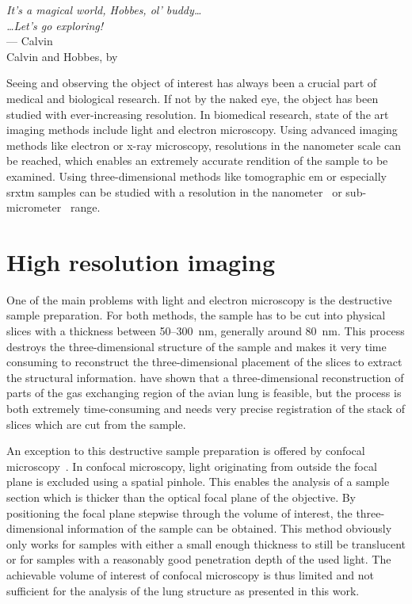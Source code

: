 \acresetall
{}\label{ch:introduction}
\begin{flushright}{\slshape
		It's a magical world, Hobbes, ol' buddy\ldots\\
		\ldots Let's go exploring!}\\ \medskip
		--- Calvin\\Calvin and Hobbes, by \citep{Watterson1996}
\end{flushright}
\vspace{74mm}

Seeing and observing the object of interest has always been a crucial part of medical and biological research. If not by the naked eye, the object has been studied with ever-increasing resolution. In biomedical research, state of the art imaging methods include light and electron microscopy. Using advanced imaging methods like electron or x-ray microscopy, resolutions in the nanometer scale can be reached, which enables an extremely accurate rendition of the sample to be examined. Using three-dimensional methods like tomographic \ac{em} or especially \ac{srxtm} samples can be studied with a resolution in the nanometer~\cite{Downing2007} or sub-micrometer~\cite{Stampanoni2010} range.

\section{High resolution imaging}
One of the main problems with light and electron microscopy is the destructive sample preparation. For both methods, the sample has to be cut into physical slices with a thickness between 50--\SI{300}{\nano\meter}, generally around \SI{80}{\nano\meter}. This process destroys the three-dimensional structure of the sample and makes it very time consuming to reconstruct the three-dimensional placement of the slices to extract the structural information. \citet{Woodward2005} have shown that a three-dimensional reconstruction of parts of the gas exchanging region of the avian lung is feasible, but the process is both extremely time-consuming and needs very precise registration of the stack of slices which are cut from the sample.

An exception to this destructive sample preparation is offered by confocal microscopy~\cite{Minsky1961}. In confocal microscopy, light originating from outside the focal plane is excluded using a spatial pinhole. This enables the analysis of a sample section which is thicker than the optical focal plane of the objective. By positioning the focal plane stepwise through the volume of interest, the three-dimensional information of the sample can be obtained. This method obviously only works for samples with either a small enough thickness to still be translucent or for samples with a reasonably good penetration depth of the used light. The achievable volume of interest of confocal microscopy is thus limited and not sufficient for the analysis of the lung structure as presented in this work. 

